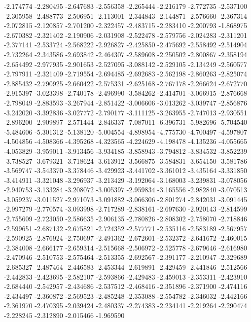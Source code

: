 -2.174774
-2.280495
-2.647683
-2.556358
-2.265444
-2.216179
-2.772735
-2.537100
-2.305958
-2.488773
-2.506951
-2.113001
-2.344843
-2.144871
-2.576660
-2.367314
-2.072815
-2.120857
-2.701200
-2.322457
-2.483715
-2.283410
-2.200793
-1.868975
-2.670382
-2.321402
-2.190906
-2.031908
-2.522478
-2.579756
-2.024283
-2.311201
-2.377141
-2.533724
-2.568222
-2.926827
-2.425850
-2.475692
-2.558492
-2.514904
-2.732264
-2.343586
-2.693842
-2.464307
-2.589608
-2.250502
-2.800867
-2.358194
-2.654492
-2.977935
-2.901653
-2.527095
-3.088142
-2.529105
-2.134249
-2.560577
-2.797911
-2.321409
-2.719554
-2.694485
-2.692683
-2.562198
-2.860263
-2.825074
-2.885432
-2.790925
-2.660422
-2.575331
-2.625168
-2.767178
-2.266624
-2.672770
-2.915397
-3.023398
-2.740178
-2.496990
-3.584262
-2.414701
-3.066915
-2.876668
-2.798049
-2.883593
-3.267944
-2.851422
-3.006606
-3.013262
-3.039747
-2.856876
-3.242020
-3.392836
-3.027772
-2.790177
-3.111125
-3.263955
-2.747013
-2.930551
-2.896200
-2.909897
-2.571444
-2.846337
-7.087011
-6.396731
-5.982696
-5.704540
-5.484606
-5.301312
-5.138120
-5.004554
-4.898954
-4.775730
-4.700497
-4.597807
-4.504856
-4.508366
-4.395268
-4.323565
-4.224629
-4.198478
-4.135236
-4.055665
-4.053829
-3.959011
-3.913456
-3.934185
-3.858943
-3.794812
-3.834532
-3.852239
-3.738527
-3.679321
-3.718624
-3.613912
-3.566875
-3.584831
-3.654150
-3.581786
-3.569747
-3.543370
-3.378446
-3.429923
-3.441702
-3.361012
-3.435164
-3.331850
-3.414911
-3.321048
-3.296937
-3.213429
-3.192064
-3.168003
-3.239831
-3.078056
-2.940753
-3.133284
-3.208072
-3.005397
-2.959834
-3.165556
-2.982840
-3.070513
-3.059237
-3.011527
-2.971073
-3.091882
-3.066306
-2.801274
-2.842031
-3.091445
-2.997279
-2.770574
-3.093998
-2.717289
-2.838161
-2.697630
-2.920143
-2.814599
-2.755609
-2.723050
-2.586635
-2.906135
-2.780826
-2.808302
-2.758070
-2.718846
-2.599651
-2.687132
-2.675821
-2.724352
-2.577771
-2.535116
-2.583189
-2.567957
-2.590925
-2.876924
-2.750697
-2.491362
-2.672601
-2.532372
-2.641672
-2.460015
-2.384008
-2.666177
-2.659314
-2.515668
-2.506972
-2.525778
-2.679646
-2.616980
-2.470946
-2.510753
-2.575464
-2.513355
-2.692567
-2.391177
-2.210947
-2.329689
-2.685327
-2.487464
-2.446583
-2.453344
-2.619891
-2.429459
-2.441846
-2.512566
-2.442833
-2.423695
-2.582107
-2.593866
-2.429483
-2.459013
-2.353311
-2.423910
-2.684440
-2.542957
-2.434686
-2.537512
-2.468416
-2.351896
-2.371900
-2.474116
-2.434497
-2.360872
-2.569523
-2.485248
-2.353088
-2.554782
-2.346032
-2.442166
-2.361970
-2.470395
-2.039424
-2.480337
-2.274383
-2.234141
-2.219264
-2.290474
-2.228245
-2.312890
-2.015466
-1.969590
